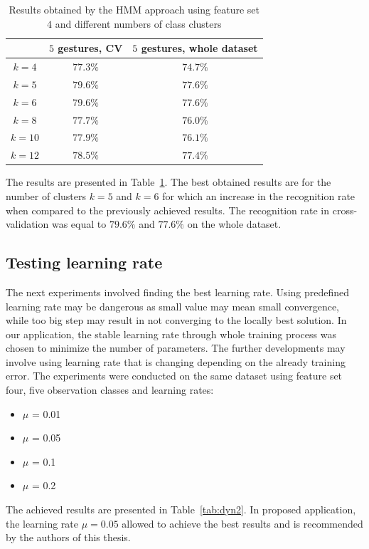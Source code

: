 \begin{table}[htbp!]
\begin{center}
	\label{tab:dynNumber}
	\caption{Results obtained by the HMM approach using feature set $4$ and different numbers of class clusters}
    \begin{tabular}{|c|c|c|}
    \hline
    ~                                 & $5$ gestures, CV & $5$ gestures, whole dataset  \\ \hline
	$k = 4$                  	  & $77.3\%$ & $74.7\%$   \\ \hline
    $k = 5$               	  & $79.6\%$ & $77.6\%$   \\ \hline
    $k = 6$                    & $79.6\%$ & $77.6\%$   \\ \hline
    $k = 8$                     & $77.7\%$ & $76.0\%$   \\ \hline
    $k = 10$                    & $77.9\%$ & $76.1\%$   \\ \hline
    $k = 12$                    & $78.5\%$ & $77.4\%$   \\ \hline
    \end{tabular}
\end{center}
\end{table}
The results are presented in Table~\ref{tab:dynNumber}.
The best obtained results are for the number of clusters $k=5$ and $k=6$ for which an increase in the recognition rate when compared to the previously achieved results. 
The recognition rate in cross-validation was equal to $79.6\%$ and $77.6\%$ on the whole dataset. 

\subsection{Testing learning rate}

The next experiments involved finding the best learning rate. 
Using predefined learning rate may be dangerous as small value may mean small convergence, while too big step may result in not converging to the locally best solution. 
In our application, the stable learning rate through whole training process was chosen to minimize the number of parameters. 
The further developments may involve using learning rate that is changing depending on the already training error.
The experiments were conducted on the same dataset using feature set four, five observation classes and learning rates:
\begin{itemize}
\item $\mu$ = 0.01
\item $\mu$ = 0.05
\item $\mu$ = 0.1
\item $\mu$ = 0.2
\end{itemize}
The achieved results are presented in Table~\ref{tab:dyn2}.
In proposed application, the learning rate $\mu = 0.05$ allowed to achieve the best results and is recommended by the authors of this thesis. 

